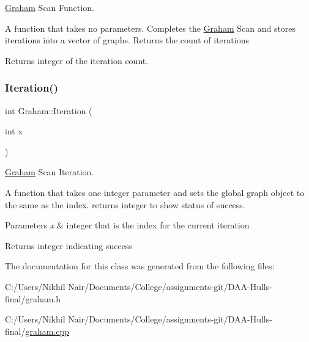 \mbox{\hyperlink{class_graham}{Graham}} Scan Function. 

A function that takes no parameters. Completes the \mbox{\hyperlink{class_graham}{Graham}} Scan and stores iterations into a vector of graphs. Returns the count of iterations

\begin{DoxyReturn}{Returns}
integer of the iteration count. 
\end{DoxyReturn}
\mbox{\label{class_graham_a404c78e5ea03dfaf054fe33867e09119}} 
\subsubsection{\texorpdfstring{Iteration()}{Iteration()}}
{\footnotesize\ttfamily int Graham\+::\+Iteration (\begin{DoxyParamCaption}\item[{int}]{x }\end{DoxyParamCaption})\hspace{0.3cm}{\ttfamily [static]}}



\mbox{\hyperlink{class_graham}{Graham}} Scan Iteration. 

A function that takes one integer parameter and sets the global graph object to the same as the index. returns integer to show status of success. 
\begin{DoxyParams}{Parameters}
{\em x} & integer that is the index for the current iteration \\
\hline
\end{DoxyParams}
\begin{DoxyReturn}{Returns}
integer indicating success 
\end{DoxyReturn}


The documentation for this class was generated from the following files\+:\begin{DoxyCompactItemize}
\item 
C\+:/\+Users/\+Nikhil Nair/\+Documents/\+College/assignments-\/git/\+D\+A\+A-\/\+Hulls-\/final/graham.\+h\item 
C\+:/\+Users/\+Nikhil Nair/\+Documents/\+College/assignments-\/git/\+D\+A\+A-\/\+Hulls-\/final/\mbox{\hyperlink{graham_8cpp}{graham.\+cpp}}\end{DoxyCompactItemize}
